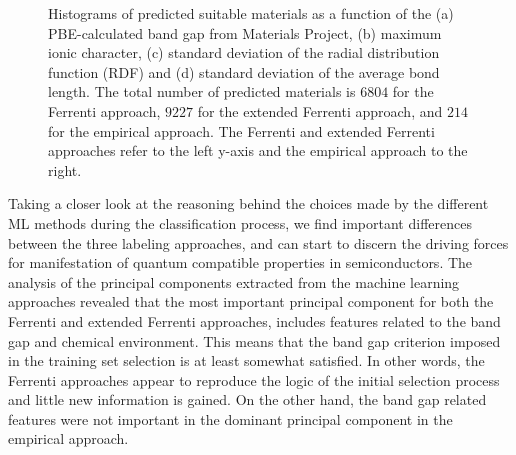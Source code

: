 \documentclass[superscriptaddress,unsortedaddress,
 amsmath,amssymb,
 aps,
]{revtex4-2}
\begin{document}
\begin{figure}[ht]
    \begin{subfigure}[b]{1\textwidth}
    \centering
    
  \end{subfigure}
  \par\bigskip
\begin{subfigure}[b]{0.45\textwidth}
    
    \subcaption{}
\end{subfigure}
\begin{subfigure}[b]{0.45\textwidth}
    
    \subcaption{}
\end{subfigure}%

\begin{subfigure}[b]{0.45\textwidth}
    
    \subcaption{}
\end{subfigure}
\begin{subfigure}[b]{0.45\textwidth}
    
    \subcaption{}
\end{subfigure}
\caption{Histograms of predicted suitable materials as a function of the (a) PBE-calculated band gap from Materials Project, (b) maximum ionic character, (c) standard deviation of the radial distribution function (RDF) and (d) standard deviation of the average bond length. The total number of predicted materials is  $6804$ for the Ferrenti approach, $9227$ for the extended Ferrenti approach, and $214$ for the empirical approach. The Ferrenti and extended Ferrenti approaches refer to the left y-axis and the empirical approach to the right.
    }
\label{fig:histogram_new}
\end{figure}

Taking a closer look at the reasoning behind the choices made by the different ML methods during the classification process, we find important differences between the three labeling approaches, and can start to discern the driving forces for manifestation of quantum compatible properties in semiconductors. 
The analysis of the principal components extracted from the machine learning approaches revealed that the most important principal component for both the Ferrenti and extended Ferrenti approaches, includes features related to the band gap and chemical environment. This means that the band gap criterion imposed in the training set selection is at least somewhat satisfied. 
In other words, the Ferrenti approaches appear to reproduce the logic of the initial selection process and little new information is gained. 
On the other hand, the band gap related features were not important in the dominant principal component in the empirical approach. 
\end{document}
